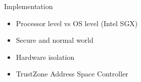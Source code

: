 \documentclass[]{beamer}
\begin{document}
\begin{frame}{Implementation}
\begin{itemize}
\item Processor level vs OS level (Intel SGX)
\item Secure and normal world
\item Hardware isolation
\item TrustZone Address Space Controller
\end{itemize}
\end{frame}
\end{document}
